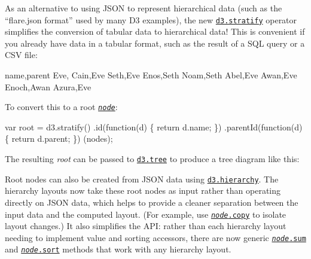 As an alternative to using J\+S\+ON to represent hierarchical data (such as the “flare.\+json format” used by many D3 examples), the new \href{https://github.com/d3/d3-hierarchy/blob/master/README.md#stratify}{\tt d3.\+stratify} operator simplifies the conversion of tabular data to hierarchical data! This is convenient if you already have data in a tabular format, such as the result of a S\+QL query or a C\+SV file\+:


\begin{DoxyCode}
name,parent
Eve,
Cain,Eve
Seth,Eve
Enos,Seth
Noam,Seth
Abel,Eve
Awan,Eve
Enoch,Awan
Azura,Eve
\end{DoxyCode}


To convert this to a root \href{https://github.com/d3/d3-hierarchy/blob/master/README.md#hierarchy}{\tt {\itshape node}}\+:


\begin{DoxyCode}
var root = d3.stratify()
    .id(function(d) \{ return d.name; \})
    .parentId(function(d) \{ return d.parent; \})
    (nodes);
\end{DoxyCode}


The resulting {\itshape root} can be passed to \href{https://github.com/d3/d3-hierarchy/blob/master/README.md#tree}{\tt d3.\+tree} to produce a tree diagram like this\+:



Root nodes can also be created from J\+S\+ON data using \href{https://github.com/d3/d3-hierarchy/blob/master/README.md#hierarchy}{\tt d3.\+hierarchy}. The hierarchy layouts now take these root nodes as input rather than operating directly on J\+S\+ON data, which helps to provide a cleaner separation between the input data and the computed layout. (For example, use \href{https://github.com/d3/d3-hierarchy/blob/master/README.md#node_copy}{\tt {\itshape node}.copy} to isolate layout changes.) It also simplifies the A\+PI\+: rather than each hierarchy layout needing to implement value and sorting accessors, there are now generic \href{https://github.com/d3/d3-hierarchy/blob/master/README.md#node_sum}{\tt {\itshape node}.sum} and \href{https://github.com/d3/d3-hierarchy/blob/master/README.md#node_sort}{\tt {\itshape node}.sort} methods that work with any hierarchy layout.


